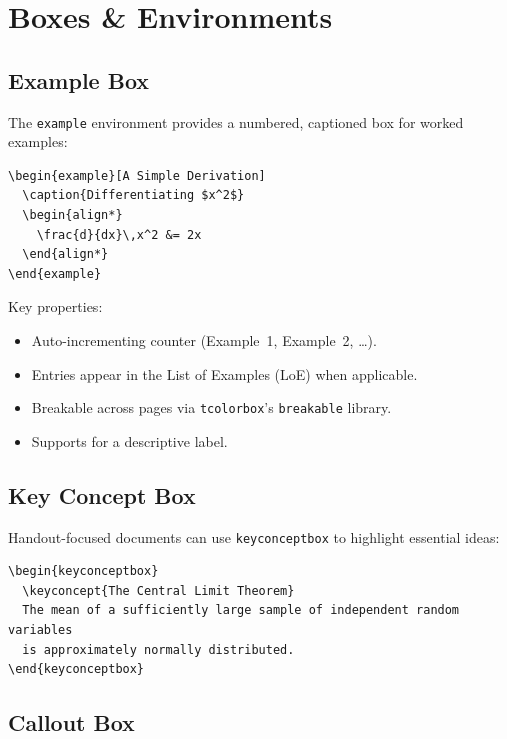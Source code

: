 \chapter{Boxes \& Environments}
\label{ch:boxes}

\section{Example Box}

The \texttt{example} environment provides a numbered, captioned box for
worked examples:

\begin{verbatim}
\begin{example}[A Simple Derivation]
  \caption{Differentiating $x^2$}
  \begin{align*}
    \frac{d}{dx}\,x^2 &= 2x
  \end{align*}
\end{example}
\end{verbatim}

Key properties:

\begin{itemize}
  \item Auto-incrementing counter (Example~1, Example~2, \ldots).
  \item Entries appear in the List of Examples (LoE) when applicable.
  \item Breakable across pages via \texttt{tcolorbox}'s \texttt{breakable}
        library.
  \item Supports  for a descriptive label.
\end{itemize}

\section{Key Concept Box}

Handout-focused documents can use \texttt{keyconceptbox} to highlight
essential ideas:

\begin{verbatim}
\begin{keyconceptbox}
  \keyconcept{The Central Limit Theorem}
  The mean of a sufficiently large sample of independent random variables
  is approximately normally distributed.
\end{keyconceptbox}
\end{verbatim}

\section{Callout Box}

